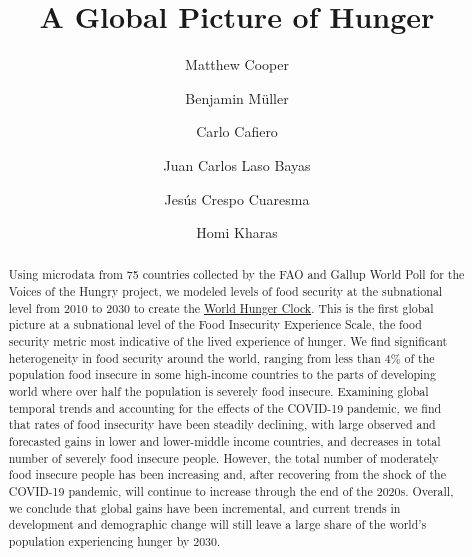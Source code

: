 \documentclass{article}
\begin{document}
\title{A Global Picture of Hunger}

\author[1,2,*]{Matthew Cooper}
\author[2,3]{Benjamin Müller}
\author[4]{Carlo Cafiero}
\author[2,5]{Juan Carlos Laso Bayas}
\author[5,6]{Jesús Crespo Cuaresma}
\author[2,7]{Homi Kharas}


\maketitle
\begin{abstract}
Using microdata from 75 countries collected by the FAO and Gallup World Poll for the Voices of the Hungry project, we modeled levels of food security at the subnational level from 2010 to 2030 to create the \href{https://worldhunger.io}{World Hunger Clock}.  This is the first global picture at a subnational level of the Food Insecurity Experience Scale, the food security metric most indicative of the lived experience of hunger.  We find significant heterogeneity in food security around the world, ranging from less than 4\% of the population food insecure in some high-income countries to the parts of developing world where over half the population is severely food insecure.  Examining global temporal trends and accounting for the effects of the COVID-19 pandemic, we find that rates of food insecurity have been steadily declining, with large observed and forecasted gains in lower and lower-middle income countries, and decreases in total number of severely food insecure people.  However, the total number of moderately food insecure people has been increasing and, after recovering from the shock of the COVID-19 pandemic, will continue to increase through the end of the 2020s.  Overall, we conclude that global gains have been incremental, and current trends in development and demographic change will still leave a large share of the world's population experiencing hunger by 2030.  \end{abstract}
\end{document}
